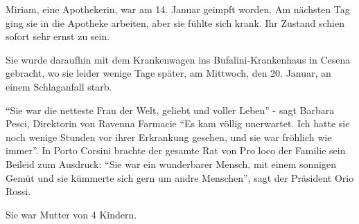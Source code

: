 Miriam, eine Apothekerin, war am 14. Januar geimpft worden. Am nächsten Tag ging
sie in die Apotheke arbeiten, aber sie fühlte sich krank. Ihr Zustand schien
sofort sehr ernst zu sein.

Sie wurde daraufhin mit dem Krankenwagen ins Bufalini-Krankenhaus in Cesena
gebracht, wo sie leider wenige Tage später, am Mittwoch, den 20. Januar, an
einem Schlaganfall starb.

``Sie war die netteste Frau der Welt, geliebt und voller Leben'' - sagt Barbara
Pesci, Direktorin von Ravenna Farmacie ``Es kam völlig unerwartet. Ich hatte sie
noch wenige Stunden vor ihrer Erkrankung gesehen, und sie war fröhlich wie
immer''. In Porto Corsini brachte der gesamte Rat von Pro loco der Familie sein
Beileid zum Ausdruck: ``Sie war ein wunderbarer Mensch, mit einem sonnigen Gemüt
und sie kümmerte sich gern um andre Menschen'', sagt der Präsident Orio Rossi.

Sie war Mutter von 4 Kindern.
